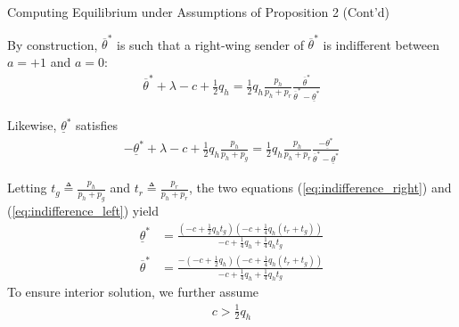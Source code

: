 \documentclass[9pt,aspectratio=1610]{beamer}
\begin{document}
\begin{frame}{Computing Equilibrium under Assumptions of Proposition 2 (Cont'd)}

By construction, $\overline{\theta}^*$ is such that a right-wing sender of $\overline{\theta}^*$ is indifferent between $a=+1$ and $a=0$:
\begin{align}\label{eq:indifference_right}
    \overline{\theta}^* + \lambda - c + \frac{1}{2}q_h = \frac{1}{2}q_h\frac{p_h}{p_h+p_r}\frac{\overline{\theta}^*}{\overline{\theta}^* - \underline{\theta}^*}
\end{align}

Likewise, $\underline{\theta}^*$ satisfies
\begin{align}\label{eq:indifference_left}
    -\underline{\theta}^* + \lambda - c + \frac{1}{2}q_h \frac{p_h}{p_h+p_g} = \frac{1}{2}q_h\frac{p_h}{p_h+p_r}\frac{-\underline{\theta}^*}{\overline{\theta}^* - \underline{\theta}^*}
\end{align}


Letting $t_g\triangleq \frac{p_h}{p_h+p_g}$ and $t_r\triangleq\frac{p_r}{p_h+p_r}$, the two equations (\ref{eq:indifference_right}) and (\ref{eq:indifference_left}) yield
\begin{align*}
    \underline{\theta}^* &= \frac{(-c+\frac{1}{2}q_ht_g)(-c+\frac{1}{4}q_h(t_r + t_g))}{-c+\frac{1}{4}q_h+\frac{1}{4}q_ht_g}\\
    \overline{\theta}^* &= \frac{-(-c+\frac{1}{2}q_h)(-c+\frac{1}{4}q_h(t_r + t_g))}{-c+\frac{1}{4}q_h+\frac{1}{4}q_ht_g}
\end{align*}
To ensure interior solution, we further assume
\begin{align*}
    c>\frac{1}{2}q_h
\end{align*}
\end{frame}
\end{document}
